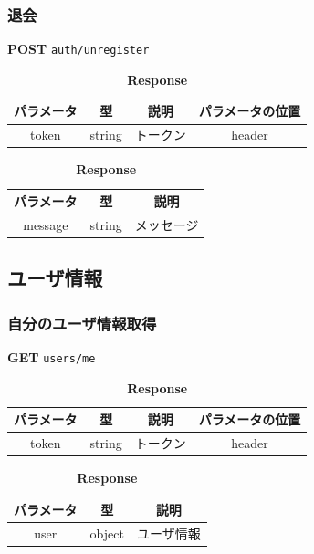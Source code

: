 \subsubsection*{退会}
\textbf{POST} \texttt{auth/unregister}
\begin{table}[H]
  \begin{minipage}
    {0.5\hsize} \centering
    \captionsetup{labelformat=empty,labelsep=none}
    \caption{\textbf{Request}}
    \begin{tabular}{|c|c|c|c|} \hline
      パラメータ & 型      & 説明   & パラメータの位置 \\ \hline \hline
      token & string & トークン & header   \\ \hline
    \end{tabular}
  \end{minipage}
  \begin{minipage}
    {0.5\hsize} \centering
    \captionsetup{labelformat=empty,labelsep=none}
    \caption{\textbf{Response}}
    \begin{tabular}{|c|c|c|} \hline
      パラメータ   & 型      & 説明    \\ \hline \hline
      message & string & メッセージ \\ \hline
    \end{tabular}
  \end{minipage}
\end{table}
\hrulefill
\subsection{ユーザ情報}
\subsubsection*{自分のユーザ情報取得}
\textbf{GET} \texttt{users/me}
\begin{table}[H]
  \begin{minipage}
    {0.5\hsize} \centering
    \captionsetup{labelformat=empty,labelsep=none}
    \caption{\textbf{Request}}
    \begin{tabular}{|c|c|c|c|} \hline
      パラメータ & 型      & 説明   & パラメータの位置 \\ \hline \hline
      token & string & トークン & header   \\ \hline
    \end{tabular}
  \end{minipage}
  \begin{minipage}
    {0.5\hsize} \centering
    \captionsetup{labelformat=empty,labelsep=none}
    \caption{\textbf{Response}}
    \begin{tabular}{|c|c|c|} \hline
      パラメータ & 型      & 説明    \\ \hline \hline
      user  & object & ユーザ情報 \\ \hline
    \end{tabular}
  \end{minipage}
\end{table}

